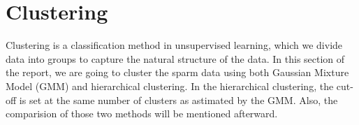 \section{Clustering}

Clustering is a classification method in unsupervised learning, which we divide data into groups to capture the natural structure of the data. In this section of the report, we are going to cluster the sparm data using both Gaussian Mixture Model (GMM) and hierarchical clustering. In the hierarchical clustering, the cut-off is set at the same number of clusters as astimated by the GMM. Also, the comparision of those two methods will be mentioned afterward.


\newpage

\newpage

\newpage


